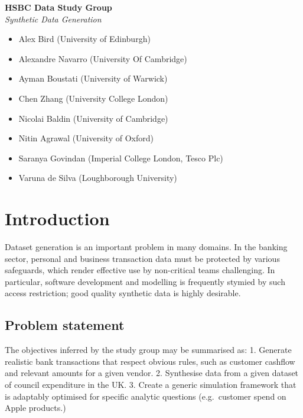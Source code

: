 \documentclass[]{article}
\begin{document}
\begin{center}
  \Large\textbf{HSBC Data Study Group}\\
  \large\textit{Synthetic Data Generation}
\end{center}

\begin{center}
%
{\begin{itemize}
    \tightlist
    \item Alex Bird (University of Edinburgh)
    \item  Alexandre Navarro (University Of Cambridge)
    \item Ayman Boustati (University of Warwick)
    \item Chen Zhang (University College London)
    \item Nicolai Baldin (University of Cambridge)
    \item Nitin Agrawal (University of Oxford)
    \item Saranya Govindan (Imperial College London, Tesco Plc)
    \item  Varuna de Silva (Loughborough University)
\end{itemize}}
\end{center}

\tableofcontents

\section{Introduction}\label{introduction}

Dataset generation is an important problem in many domains. In the
banking sector, personal and business transaction data must be protected
by various safeguards, which render effective use by non-critical teams
challenging. In particular, software development and modelling is
frequently stymied by such access restriction; good quality synthetic
data is highly desirable.

\subsection{Problem statement}\label{problem-statement}

The objectives inferred by the study group may be summarised as: 1.
Generate realistic bank transactions that respect obvious rules, such as
customer cashflow and relevant amounts for a given vendor. 2. Synthesise
data from a given dataset of council expenditure in the UK. 3. Create a
generic simulation framework that is adaptably optimised for specific
analytic questions (e.g.~customer spend on Apple products.)
\end{document}
